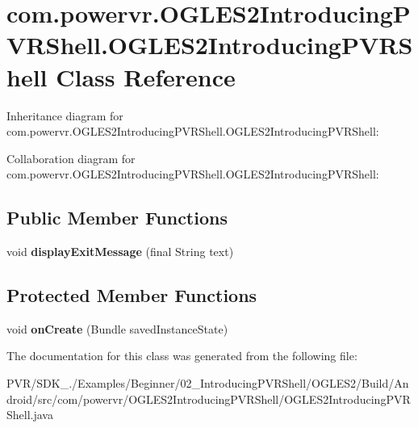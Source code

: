 \hypertarget{classcom_1_1powervr_1_1_o_g_l_e_s2_introducing_p_v_r_shell_1_1_o_g_l_e_s2_introducing_p_v_r_shell}{\section{com.\+powervr.\+O\+G\+L\+E\+S2\+Introducing\+P\+V\+R\+Shell.\+O\+G\+L\+E\+S2\+Introducing\+P\+V\+R\+Shell Class Reference}
\label{classcom_1_1powervr_1_1_o_g_l_e_s2_introducing_p_v_r_shell_1_1_o_g_l_e_s2_introducing_p_v_r_shell}
}


Inheritance diagram for com.\+powervr.\+O\+G\+L\+E\+S2\+Introducing\+P\+V\+R\+Shell.\+O\+G\+L\+E\+S2\+Introducing\+P\+V\+R\+Shell\+:


Collaboration diagram for com.\+powervr.\+O\+G\+L\+E\+S2\+Introducing\+P\+V\+R\+Shell.\+O\+G\+L\+E\+S2\+Introducing\+P\+V\+R\+Shell\+:
\subsection*{Public Member Functions}
\begin{DoxyCompactItemize}
\item 
\hypertarget{classcom_1_1powervr_1_1_o_g_l_e_s2_introducing_p_v_r_shell_1_1_o_g_l_e_s2_introducing_p_v_r_shell_aecbc6d1bd952f1b69e230dee9f38f5fb}{void {\bfseries display\+Exit\+Message} (final String text)}\label{classcom_1_1powervr_1_1_o_g_l_e_s2_introducing_p_v_r_shell_1_1_o_g_l_e_s2_introducing_p_v_r_shell_aecbc6d1bd952f1b69e230dee9f38f5fb}

\end{DoxyCompactItemize}
\subsection*{Protected Member Functions}
\begin{DoxyCompactItemize}
\item 
\hypertarget{classcom_1_1powervr_1_1_o_g_l_e_s2_introducing_p_v_r_shell_1_1_o_g_l_e_s2_introducing_p_v_r_shell_a2e61fd79b304487e0f9770499cfdcb1e}{void {\bfseries on\+Create} (Bundle saved\+Instance\+State)}\label{classcom_1_1powervr_1_1_o_g_l_e_s2_introducing_p_v_r_shell_1_1_o_g_l_e_s2_introducing_p_v_r_shell_a2e61fd79b304487e0f9770499cfdcb1e}

\end{DoxyCompactItemize}


The documentation for this class was generated from the following file\+:\begin{DoxyCompactItemize}
\item 
P\+V\+R/\+S\+D\+K\+\_./\+Examples/\+Beginner/02\+\_\+\+Introducing\+P\+V\+R\+Shell/\+O\+G\+L\+E\+S2/\+Build/\+Android/src/com/powervr/\+O\+G\+L\+E\+S2\+Introducing\+P\+V\+R\+Shell/O\+G\+L\+E\+S2\+Introducing\+P\+V\+R\+Shell.\+java\end{DoxyCompactItemize}
